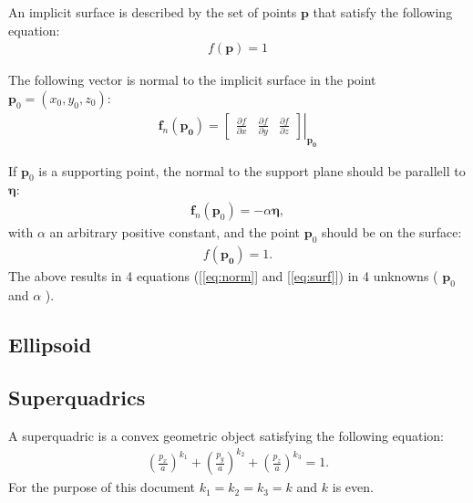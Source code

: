 \documentclass[10pt,a4paper]{article}
\newcommand{\myvec}[1] {\mathbf{\boldsymbol{#1}}}
\begin{document}
An implicit surface is described by the set of points $\mathbf{p}$ that satisfy the following equation:
\begin{align}
    f(\mathbf{p}) = 1
\end{align}


The following vector is normal to the implicit surface in the point $\mathbf{p}_0 = (x_0,y_0,z_0)$:
\begin{align}
    \mathbf{f}_n(\mathbf{p_0}) =
    \left.  
    \begin{bmatrix}
        \frac{\partial f}{\partial x} &
        \frac{\partial f}{\partial y} &
        \frac{\partial f}{\partial z} 
    \end{bmatrix} 
    \right|_{\mathbf{p_0}}
\end{align}


If $\mathbf{p}_0$ is a supporting point, the normal to the support plane should be parallell to $\myvec{\eta}$:
\begin{align}
    \mathbf{f}_n(\mathbf{p}_0) = -\alpha \myvec{\eta},
    \label{eq:norm}
\end{align}
with $\alpha$ an arbitrary positive constant, and the point $\mathbf{p}_0$ should be on the surface:
\begin{align}
    f(\mathbf{p_0}) = 1.
    \label{eq:surf}
\end{align}
The above results in 4 equations ([\ref{eq:norm}] and [\ref{eq:surf}]) in 4 unknowns ( $\mathbf{p}_0$ and $\alpha$ ).

\subsection{Ellipsoid}

\subsection{Superquadrics}
A superquadric is a convex geometric object satisfying the following equation:
\begin{align}
    \left( \frac{p_x}{a} \right)^{k_1} +
    \left( \frac{p_y}{a} \right)^{k_2} +
    \left( \frac{p_z}{a} \right)^{k_3}    = 1.
\end{align}
For the purpose of this document $k_1 = k_2 = k_3 = k$ and $k$ is even.
%
%
\end{document}
